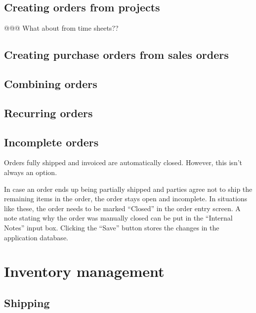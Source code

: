 \section{Creating orders from projects}
\label{sec-business-processes-orders-creation-from-projects}

@@@ What about from time sheets??

\section{Creating purchase orders from sales orders}
\label{sec-business-processes-orders-purchase-from-sales}

\section{Combining orders}
\label{sec-business-processes-orders-combining}


\section{Recurring orders}
\label{sec-business-processes-orders-recurring}


\section{Incomplete orders}
\label{sec-business-processes-orders-incomplete}

Orders fully shipped and invoiced are automatically closed. However, this isn't always an option.

In case an order ends up being partially shipped and parties agree not to ship the remaining
items in the order, the order stays open and incomplete. In situations like these, the order
needs to be marked ``Closed'' in the order entry screen. A note stating why the order was manually
closed can be put in the ``Internal Notes'' input box. Clicking the ``Save'' button stores the
changes in the application database.


\chapter{Inventory management}
\label{cha-business-processes-inventory}

\section{Shipping}
\label{sec-business-processes-inventory-shipping}

